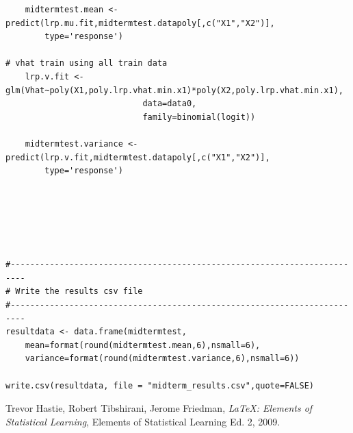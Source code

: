 \documentclass[twoside,12pt]{article}
\begin{document}
\begin{verbatim}
	midtermtest.mean <- predict(lrp.mu.fit,midtermtest.datapoly[,c("X1","X2")],
		type='response')

# vhat train using all train data
	lrp.v.fit <- glm(Vhat~poly(X1,poly.lrp.vhat.min.x1)*poly(X2,poly.lrp.vhat.min.x1),
							data=data0,
							family=binomial(logit))

	midtermtest.variance <- predict(lrp.v.fit,midtermtest.datapoly[,c("X1","X2")],
		type='response')






#-------------------------------------------------------------------------
# Write the results csv file
#-------------------------------------------------------------------------
resultdata <- data.frame(midtermtest,
	mean=format(round(midtermtest.mean,6),nsmall=6),
	variance=format(round(midtermtest.variance,6),nsmall=6))

write.csv(resultdata, file = "midterm_results.csv",quote=FALSE)

\end{verbatim}




\begin{thebibliography}{9}

  Trevor Hastie, Robert Tibshirani, Jerome Friedman,
  \emph{\LaTeX: Elements of Statistical Learning},
  Elements of Statistical Learning Ed. 2,
  2009.

\end{thebibliography}
\end{document}
